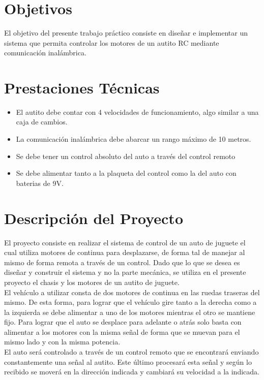 \documentclass[a4paper,10pt]{article}
\title{  }
\begin{document}
	\maketitle %
	\newpage

	\tableofcontents %
	\newpage

	\section{Objetivos}
		El objetivo del presente trabajo práctico consiste en diseñar e implementar un sistema que permita controlar los motores de un autito RC mediante 
		comunicación inalámbrica. 

	\section{Prestaciones Técnicas}
		\begin{itemize}
			\item El autito debe contar con 4 velocidades de funcionamiento, algo similar a una caja de cambios.
			\item La comunicación inalámbrica debe abarcar un rango máximo de 10 metros. 
			\item Se debe tener un control absoluto del auto a través del control remoto
			\item Se debe alimentar tanto a la plaqueta del control como la del auto con baterias de 9V.
		\end{itemize} 

	\section{Descripción del Proyecto}
		El proyecto consiste en realizar el sistema de control de un auto de juguete el cual utiliza motores de continua para desplazarse, de forma tal de 
		manejar al mismo de forma remota a través de un control. Dado que lo que se desea es diseñar y construir el sistema y no la parte mecánica, se
		 utiliza en el presente proyecto  el chasis y los motores de un autito de juguete. \\
		\indent El vehículo a utilizar consta de dos motores de continua en las ruedas traseras del mismo. De esta forma, para lograr que el vehículo gire 
		tanto a la derecha como a la izquierda se debe alimentar a uno de los motores mientras el otro se mantiene fijo. Para lograr que el auto se desplace 
		para adelante o atrás solo basta con alimentar a los motores con la misma señal de forma que se muevan para el mismo lado y con la misma 
		potencia. \\
		\indent El auto será controlado a través de un control remoto que se encontrará enviando constantemente una señal al autito. Este último procesará 
		esta señal
		y según lo recibido se moverá en la dirección indicada y cambiará su velocidad a la indicada.
	
\end{document}
